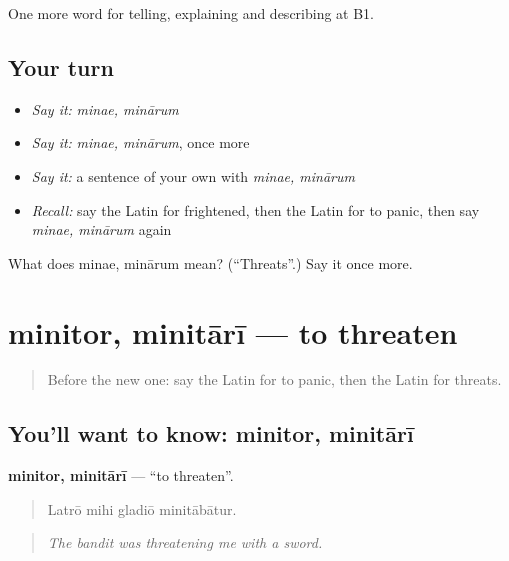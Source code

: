 \begin{grammarlens}[title={What you've built}]
One more word for telling, explaining and describing at B1.
\end{grammarlens}

\subsection*{Your turn}
\begin{itemize}
\raggedright
  \item \emph{Say it:} \emph{minae, minārum}
  \item \emph{Say it:} \emph{minae, minārum}, once more
  \item \emph{Say it:} a sentence of your own with \emph{minae, minārum}
  \item \emph{Recall:} say the Latin for frightened, then the Latin for to panic, then say \emph{minae, minārum} again
\end{itemize}

\begin{tcolorbox}[breakable,colback=teal!4,colframe=teal!35!black,title={Before you move on}]
What does minae, minārum mean? (\textquotedblleft{}Threats\textquotedblright{}.) Say it once more.
\end{tcolorbox}
\section[minitor, minitārī]{minitor, minitārī — to threaten}

\label{lesson:LA-C321-minitor}



\begin{quote}
Before the new one: say the Latin for to panic, then the Latin for threats.
\end{quote}

\subsection*{You'll want to know: minitor, minitārī}
\textbf{minitor, minitārī} — \textquotedblleft{}to threaten\textquotedblright{}.

\begin{quote}
Latrō mihi gladiō minitābātur.
\end{quote}

\begin{quote}
\emph{The bandit was threatening me with a sword.}
\end{quote}

